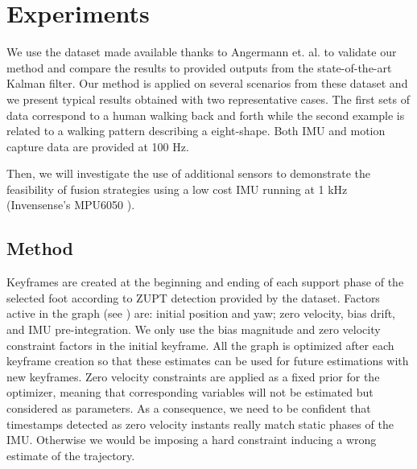 
\section{Experiments} \label{sec:experiments}

We use the dataset made available thanks to Angermann et. al. \cite{angermann2010high} to validate our method and compare the results to provided outputs from the state-of-the-art Kalman filter.
Our method is applied on several scenarios from these dataset and we present typical results obtained with two representative cases. The first sets of data correspond to a human walking back and forth 
while the second example is related to a walking pattern describing a eight-shape. Both IMU and motion capture data are provided at 100 Hz.

Then, we will investigate the use of additional sensors to demonstrate the feasibility of fusion strategies using a low cost IMU running at 1 kHz (Invensense's MPU6050 \cite{InvenSense}).


\subsection{Method}

Keyframes are created at the beginning and ending of each support phase of the selected foot according to ZUPT detection provided by the dataset. Factors active in the graph (see ) are: initial position and yaw; zero velocity, bias drift, and IMU pre-integration. We only use the bias magnitude 
and zero velocity constraint factors in the initial keyframe. All the graph is optimized after each keyframe creation so that these estimates can be used for future estimations with new keyframes. Zero velocity constraints are applied 
as a fixed prior for the optimizer, meaning that corresponding variables will not be estimated but considered as parameters. As a consequence, we need to be confident that timestamps detected as zero velocity instants really match static phases of the IMU. 
Otherwise we would be imposing a hard constraint inducing a wrong estimate of the trajectory.

